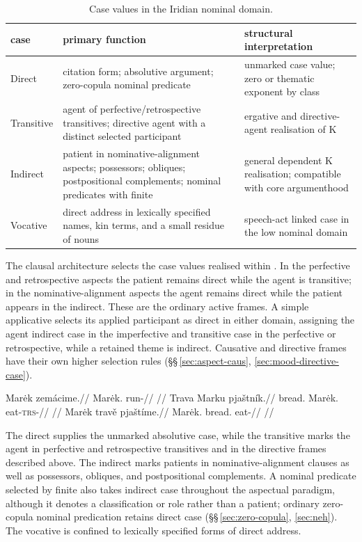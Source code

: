 \begin{table}
  \footnotesize
  \caption{Case values in the Iridian nominal domain.}
  \label{tab:nm-cases}
  \begin{tabularx}{\textwidth}{l L L}
    \toprule
    {\sc case} & {\sc primary function} & {\sc structural interpretation} \\
    \midrule
    Direct & citation form; absolutive argument; zero-copula nominal predicate &
    unmarked case value; zero or thematic exponent by class \\
    Transitive & agent of perfective/retrospective transitives;
    directive agent with a distinct selected participant &
    ergative and directive-agent realisation of K \\
    Indirect & patient in nominative-alignment aspects; possessors;
    obliques; postpositional complements; nominal predicates with finite  &
    general dependent K realisation; compatible with core argumenthood \\
    Vocative & direct address in lexically specified names, kin
    terms, and a small residue of nouns &
    speech-act linked case in the low nominal domain \\
    \bottomrule
  \end{tabularx}
\end{table}

The clausal architecture selects the case values realised within
. In the perfective and retrospective aspects the patient
remains direct while the agent is transitive; in the nominative-alignment
aspects the agent remains direct while the patient appears in the indirect.
These are the ordinary active frames. A simple applicative selects its applied
participant as direct in either domain, assigning the agent indirect case in
the imperfective and transitive case in the perfective or retrospective,
while a retained theme is indirect. Causative and directive frames have their
own higher selection rules (§§\,\ref{sec:aspect-caus},
\ref{sec:mood-directive-case}).

\pex
\a
\begingl
\gla Marėk zemácime.//
\glb Marėk.\Dir{} run-\Prog{}//
\glft {}//
\endgl
\a
\begingl
\gla Trava Marku pjaštník.//
\glb bread.\Dir{} Marėk.\Trs{} eat-\textsc{trs}-\Pf{}//
\glft {}//
\endgl
\a
\begingl
\gla Marėk travě pjaštíme.//
\glb Marėk.\Dir{} bread.\Ind{} eat-\Prog{}//
\glft {}//
\endgl
\xe

The direct supplies the unmarked absolutive case, while the transitive marks the
agent in perfective and retrospective transitives and in the directive frames
described above. The indirect marks patients in nominative-alignment clauses
as well as possessors, obliques, and postpositional complements. A nominal
predicate selected by finite  also takes indirect case throughout
the aspectual paradigm, although it denotes a classification or role rather
than a patient; ordinary zero-copula nominal predication retains direct case
(§§\,\ref{sec:zero-copula}, \ref{sec:neh}). The vocative is confined to
lexically specified forms of direct address.


